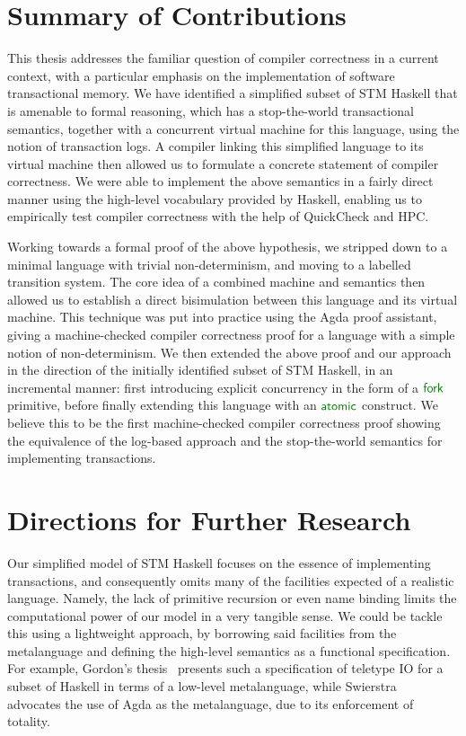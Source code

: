 
\section{Summary of Contributions}%

This thesis addresses the familiar question of compiler correctness in
a current context, with a particular emphasis on the implementation of
software transactional memory. We have identified a simplified subset of STM
Haskell that is amenable to formal reasoning, which has a stop-the-world
transactional semantics, together with a concurrent virtual machine for this
language, using the notion of transaction logs. A compiler linking this
simplified language to its virtual machine then allowed us to formulate
a concrete statement of compiler correctness. We were able to implement the
above semantics in a fairly direct manner using the high-level vocabulary
provided by Haskell, enabling us to empirically test compiler correctness
with the help of QuickCheck and HPC.

Working towards a formal proof of the above hypothesis, we stripped down to
a minimal language with trivial non-determinism, and moving to a labelled
transition system. The core idea of a combined machine and semantics then
allowed us to establish a direct bisimulation between this language and its
virtual machine. This technique was put into practice using the Agda proof
assistant, giving a machine-checked compiler correctness proof for
a language with a simple notion of non-determinism. We then extended the
above proof and our approach in the direction of the initially identified
subset of STM Haskell, in an incremental manner: first introducing explicit
concurrency in the form of a $\cons{fork}$ primitive, before finally
extending this language with an $\cons{atomic}$ construct. We believe this
to be the first machine-checked compiler correctness proof showing the
equivalence of the log-based approach and the stop-the-world semantics for
implementing transactions.


\section{Directions for Further Research}%

Our simplified model of STM Haskell focuses on the essence of implementing
transactions, and consequently omits many of the facilities expected of
a realistic language. Namely, the lack of primitive recursion or even name
binding limits the computational power of our model in a very tangible
sense. We could be tackle this using a lightweight approach, by borrowing
said facilities from the metalanguage and defining the high-level semantics
as a functional specification. For example, Gordon's
thesis~\cite{gordon92-fpio} presents such a specification of teletype IO for
a subset of Haskell in terms of a low-level metalanguage, while
Swierstra~\cite{swierstra08-funspec} advocates the use of Agda as the
metalanguage, due to its enforcement of totality.

